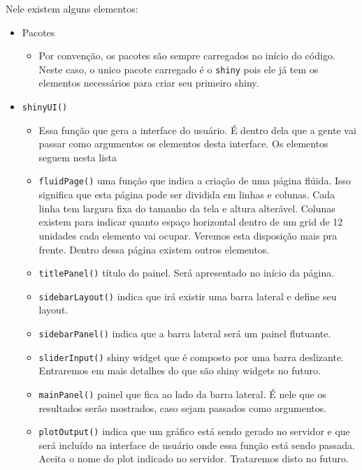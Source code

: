\documentclass[
]{book}
\providecommand{\tightlist}{%
  \setlength{\itemsep}{0pt}\setlength{\parskip}{0pt}}
\begin{document}
Nele existem alguns elementos:

\begin{itemize}
\tightlist
\item
  Pacotes

  \begin{itemize}
  \tightlist
  \item
    Por convenção, os pacotes são sempre carregados no início do código. Neste caso, o unico pacote carregado é o \texttt{shiny} pois ele já tem os elementos necessários para criar seu primeiro shiny.
  \end{itemize}
\item
  \texttt{shinyUI()}

  \begin{itemize}
  \tightlist
  \item
    Essa função que gera a interface do usuário. É dentro dela que a gente vai passar como argumentos os elementos desta interface. Os elementos seguem nesta lista
  \item
    \texttt{fluidPage()} uma função que indica a criação de uma página flúida. Isso significa que esta página pode ser dividida em linhas e colunas. Cada linha tem largura fixa do tamanho da tela e altura alterável. Colunas existem para indicar quanto espaço horizontal dentro de um grid de 12 unidades cada elemento vai ocupar. Veremos esta disposição mais pra frente. Dentro dessa página existem outros elementos.
  \item
    \texttt{titlePanel()} título do painel. Será apresentado no início da página.
  \item
    \texttt{sidebarLayout()} indica que irá existir uma barra lateral e define seu layout.
  \item
    \texttt{sidebarPanel()} indica que a barra lateral será um painel flutuante.
  \item
    \texttt{sliderInput()} shiny widget que é composto por uma barra deslizante. Entraremos em mais detalhes do que são shiny widgets no futuro.
  \item
    \texttt{mainPanel()} painel que fica ao lado da barra lateral. É nele que os resultados serão mostrados, caso sejam passados como argumentos.
  \item
    \texttt{plotOutput()} indica que um gráfico está sendo gerado no servidor e que será incluído na interface de usuário onde essa função está sendo passada. Aceita o nome do plot indicado no servidor. Trataremos disto no futuro.
  \end{itemize}
\end{itemize}
\end{document}
